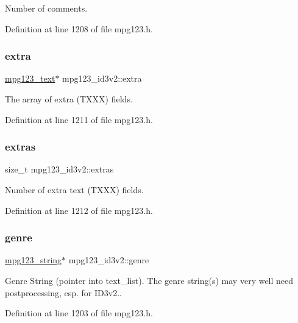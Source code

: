Number of comments. 

Definition at line 1208 of file mpg123.\+h.

\mbox{\label{structmpg123__id3v2_af11a6a5218b0616811349ee2efa8ece5}} 
\subsubsection{\texorpdfstring{extra}{extra}}
{\footnotesize\ttfamily \mbox{\hyperlink{structmpg123__text}{mpg123\+\_\+text}}$\ast$ mpg123\+\_\+id3v2\+::extra}

The array of extra (T\+X\+XX) fields. 

Definition at line 1211 of file mpg123.\+h.

\mbox{\label{structmpg123__id3v2_afefe85eb6aea14e5463b83d4e8b9ef96}} 
\subsubsection{\texorpdfstring{extras}{extras}}
{\footnotesize\ttfamily size\+\_\+t mpg123\+\_\+id3v2\+::extras}

Number of extra text (T\+X\+XX) fields. 

Definition at line 1212 of file mpg123.\+h.

\mbox{\label{structmpg123__id3v2_a1655bf8bfc836ab94660bf981373f3cb}} 
\subsubsection{\texorpdfstring{genre}{genre}}
{\footnotesize\ttfamily \mbox{\hyperlink{structmpg123__string}{mpg123\+\_\+string}}$\ast$ mpg123\+\_\+id3v2\+::genre}

Genre String (pointer into text\+\_\+list). The genre string(s) may very well need postprocessing, esp. for I\+D3v2.. 

Definition at line 1203 of file mpg123.\+h.

\mbox{\label{structmpg123__id3v2_ad2539ee2a294163a20ef2f67bc241d76}} 
